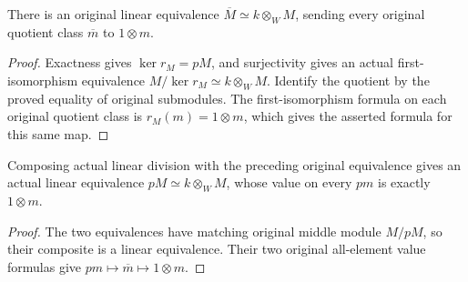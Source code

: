 \begin{theorem}
\label{thm:witt-two-residue-tensor-equivalence}
\leanok
{}
There is an original linear equivalence
$\overline M\simeq k\otimes_W M$, sending every
original quotient class $\overline m$ to
$1\otimes m$.
\end{theorem}
\begin{proof}
Exactness gives $\ker r_M=pM$, and surjectivity
gives an actual first-isomorphism equivalence
$M/\ker r_M\simeq k\otimes_W M$. Identify the
quotient by the proved equality of original
submodules. The first-isomorphism formula on each
original quotient class is $r_M(m)=1\otimes m$,
which gives the asserted formula for this same map.
\end{proof}

\begin{theorem}
\label{thm:witt-two-divided-residue-tensor}
\leanok
{}
Composing actual linear division with the preceding
original equivalence gives an actual linear
equivalence $pM\simeq k\otimes_W M$, whose value
on every $pm$ is exactly $1\otimes m$.
\end{theorem}
\begin{proof}
The two equivalences have matching original middle
module $M/pM$, so their composite is a linear
equivalence. Their two original all-element value
formulas give $pm\mapsto\overline m\mapsto1\otimes m$.
\end{proof}
